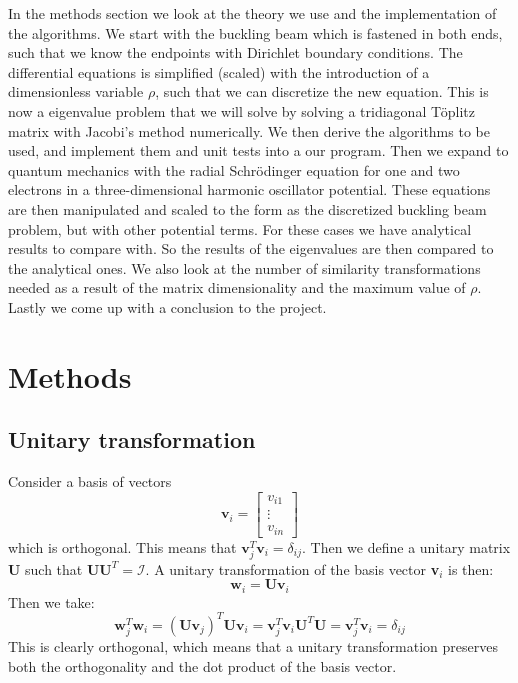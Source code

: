 \documentclass[12pt,a4paper,english]{article}
\begin{document}
In the methods section we look at the theory we use and the implementation of the algorithms. We start with the buckling beam which is fastened in both ends, such that we know the endpoints with Dirichlet boundary conditions. The differential equations is simplified (scaled) with the introduction of a dimensionless variable $\rho$, such that we can discretize the new equation. This is now a eigenvalue problem that we will solve by solving a tridiagonal Töplitz matrix with Jacobi's method numerically. We then derive the algorithms to be used, and implement them and unit tests into a our program. Then we expand to quantum mechanics with the radial Schrödinger equation for one and two electrons in a three-dimensional harmonic oscillator potential. These equations are then manipulated and scaled to the form as the discretized buckling beam problem, but with other potential terms. For these cases we have analytical results to compare with. So the results of the eigenvalues are then compared to the analytical ones. We also look at the number of similarity transformations needed as a result of the matrix dimensionality and the maximum value of $\rho$. Lastly we come up with a conclusion to the project.

\section{Methods}
\subsection{Unitary transformation}
\label{sect_unitary_transf}
Consider a basis of vectors 
\[\textbf{v}_i = \begin{bmatrix}
v_{i1}\\
\vdots\\
v_{in}
\end{bmatrix}\]
which is orthogonal. This means that $\textbf{v}_j^T\textbf{v}_i=\delta_{ij}$. Then we define a unitary matrix $\textbf{U}$ such that $\textbf{U}\textbf{U}^T=\mathcal{I}$. A unitary transformation of the basis vector \textbf{v}$_i$ is then:
\begin{equation*}
\textbf{w}_i=\textbf{U}\textbf{v}_i
\end{equation*}
Then we take:
\begin{equation*}
\textbf{w}^T_j\textbf{w}_i=(\textbf{U}\textbf{v}_j)^T\textbf{U}\textbf{v}_i=\textbf{v}_j^T\textbf{v}_i\textbf{U}^T\textbf{U}=\textbf{v}_j^T\textbf{v}_i=\delta_{ij}
\end{equation*}
This is clearly orthogonal, which means that a unitary transformation preserves both the orthogonality and the dot product of the basis vector.
\end{document}

